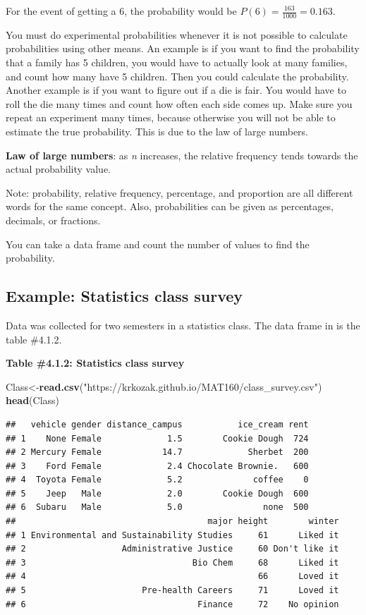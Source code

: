 \documentclass[
]{book}
\newenvironment{Shaded}{\begin{snugshade}}{\end{snugshade}}
\newcommand{\KeywordTok}[1]{\textcolor[rgb]{0.13,0.29,0.53}{\textbf{#1}}}
\newcommand{\NormalTok}[1]{#1}
\newcommand{\StringTok}[1]{\textcolor[rgb]{0.31,0.60,0.02}{#1}}
\begin{document}
For the event of getting a 6, the probability would be \(P(6)=\frac{163}{1000}=0.163\).

You must do experimental probabilities whenever it is not possible to calculate probabilities using other means. An example is if you want to find the probability that a family has 5 children, you would have to
actually look at many families, and count how many have 5 children. Then you could calculate the probability. Another example is if you want to figure out if a die is fair. You would have to roll the die many times and count how often each side comes up. Make sure you repeat an experiment many times, because otherwise you will not be able to estimate the true probability. This is due to the law of large numbers.

\textbf{Law of large numbers}: as \emph{n} increases, the relative frequency tends towards the actual probability value.

Note: probability, relative frequency, percentage, and proportion are all different words for the same concept. Also, probabilities can be given as percentages, decimals, or fractions.

You can take a data frame and count the number of values to find the probability.

\hypertarget{example-statistics-class-survey}{%
\subsection{Example: Statistics class survey}\label{example-statistics-class-survey}}

Data was collected for two semesters in a statistics class. The data frame in is the table \#4.1.2.

\textbf{Table \#4.1.2: Statistics class survey}

\begin{Shaded}
\begin{Highlighting}[]
\NormalTok{Class<-}\KeywordTok{read.csv}\NormalTok{(}\StringTok{"https://krkozak.github.io/MAT160/class_survey.csv"}\NormalTok{)}
\KeywordTok{head}\NormalTok{(Class)}
\end{Highlighting}
\end{Shaded}

\begin{verbatim}
##   vehicle gender distance_campus           ice_cream rent
## 1    None Female             1.5        Cookie Dough  724
## 2 Mercury Female            14.7             Sherbet  200
## 3    Ford Female             2.4 Chocolate Brownie.   600
## 4  Toyota Female             5.2              coffee    0
## 5    Jeep   Male             2.0        Cookie Dough  600
## 6  Subaru   Male             5.0                none  500
##                                      major height        winter
## 1 Environmental and Sustainability Studies     61      Liked it
## 2                   Administrative Justice     60 Don't like it
## 3                                 Bio Chem     68      Liked it
## 4                                              66      Loved it
## 5                       Pre-health Careers     71      Loved it
## 6                                  Finance     72    No opinion
\end{verbatim}
\end{document}
